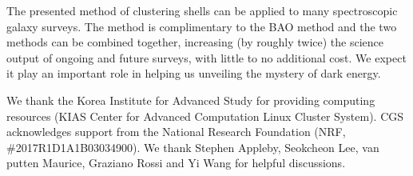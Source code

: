 \documentclass[prl,twocolumn,superscriptaddress,aps,amsmath,amssymb,nofootinbib,altaffilletter]{revtex4}
\begin{document}

The presented method of clustering shells can be applied to many spectroscopic galaxy surveys. 
The method is complimentary to the BAO method and the two methods can be combined together, 
increasing (by roughly twice) the science output of ongoing and future surveys, with little to no additional cost.
We expect it play an important role in helping us unveiling the mystery of dark energy.

\begin{acknowledgments}
We thank the Korea Institute for Advanced Study for providing computing resources (KIAS Center for Advanced Computation Linux Cluster System). 
CGS acknowledges support from the National Research Foundation (NRF,  \#2017R1D1A1B03034900). 
We thank Stephen Appleby, Seokcheon Lee, van putten Maurice, Graziano Rossi and Yi Wang for helpful discussions.
\end{acknowledgments}





\end{document}
